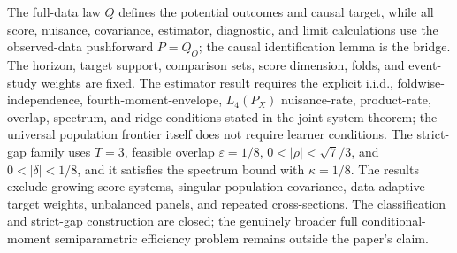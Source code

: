 The full-data law \(Q\) defines the potential outcomes and causal target, while all score, nuisance, covariance, estimator, diagnostic, and limit calculations use the observed-data pushforward \(P=Q_O\); the causal identification lemma is the bridge. The horizon, target support, comparison sets, score dimension, folds, and event-study weights are fixed. The estimator result requires the explicit i.i.d., foldwise-independence, fourth-moment-envelope, \(L_4(P_X)\) nuisance-rate, product-rate, overlap, spectrum, and ridge conditions stated in the joint-system theorem; the universal population frontier itself does not require learner conditions. The strict-gap family uses \(T=3\), feasible overlap \(\varepsilon=1/8\), \(0<|\rho|<\sqrt7/3\), and \(0<|\delta|<1/8\), and it satisfies the spectrum bound with \(\kappa=1/8\). The results exclude growing score systems, singular population covariance, data-adaptive target weights, unbalanced panels, and repeated cross-sections. The classification and strict-gap construction are closed; the genuinely broader full conditional-moment semiparametric efficiency problem remains outside the paper's claim.